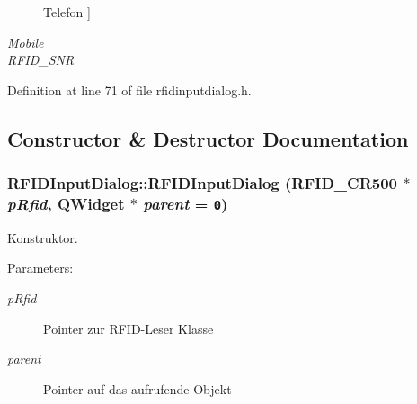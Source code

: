 \begin{Desc}
\begin{description}
{\hypertarget{class_r_f_i_d_input_dialog_3f9e936d6e5691d8ab946beebddc946c5d1284d8792796682e668e50df23450b}{
Telefon}
\label{class_r_f_i_d_input_dialog_3f9e936d6e5691d8ab946beebddc946c5d1284d8792796682e668e50df23450b}
}]\item[{\em 
\hypertarget{class_r_f_i_d_input_dialog_3f9e936d6e5691d8ab946beebddc946c29e9f511ddc4f107c171b3dd4c5facdc}{
Mobile}
\label{class_r_f_i_d_input_dialog_3f9e936d6e5691d8ab946beebddc946c29e9f511ddc4f107c171b3dd4c5facdc}
}]\item[{\em 
\hypertarget{class_r_f_i_d_input_dialog_3f9e936d6e5691d8ab946beebddc946c594e7b111105de979a41ff840022dd12}{
RFID\_\-SNR}
\label{class_r_f_i_d_input_dialog_3f9e936d6e5691d8ab946beebddc946c594e7b111105de979a41ff840022dd12}
}]\end{description}
\end{Desc}



Definition at line 71 of file rfidinputdialog.h.

\subsection{Constructor \& Destructor Documentation}
\hypertarget{class_r_f_i_d_input_dialog_cf018ae029903a460da1d2e8a6b4ab01}{
\subsubsection[RFIDInputDialog]{\setlength{\rightskip}{0pt plus 5cm}RFIDInputDialog::RFIDInputDialog ({\bf RFID\_\-CR500} $\ast$ {\em pRfid}, \/  QWidget $\ast$ {\em parent} = {\tt 0})}}
\label{class_r_f_i_d_input_dialog_cf018ae029903a460da1d2e8a6b4ab01}


Konstruktor. 

\begin{Desc}
\item[Parameters:]
\begin{description}
\item[{\em pRfid}]Pointer zur RFID-Leser Klasse \item[{\em parent}]Pointer auf das aufrufende Objekt \end{description}
\end{Desc}


